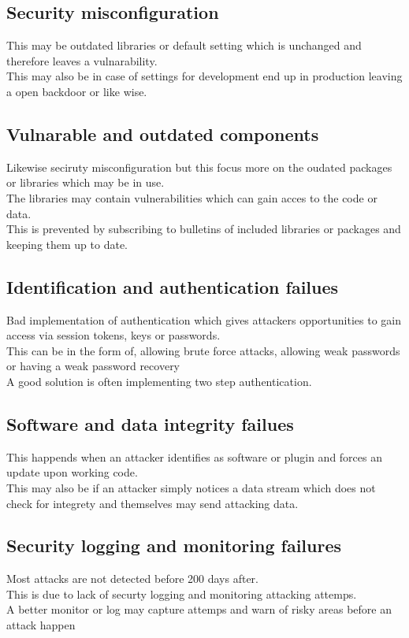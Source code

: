 \documentclass[12pt, a4paper]{article}
\begin{document}
		\subsection{Security misconfiguration}
			This may be outdated libraries or default setting which is unchanged and therefore leaves a vulnarability.\\
			This may also be in case of settings for development end up in production leaving a open backdoor or like wise.
		\subsection{Vulnarable and outdated components}
			Likewise seciruty misconfiguration but this focus more on the oudated packages or libraries which may be in use.\\
			The libraries may contain vulnerabilities which can gain acces to the code or data.\\
			This is prevented by subscribing to bulletins of included libraries or packages and keeping them up to date.
		\subsection{Identification and authentication failues}
			Bad implementation of authentication which gives attackers opportunities to gain access via session tokens, keys or passwords.\\
			This can be in the form of, allowing brute force attacks, allowing weak passwords or having a weak password recovery\\
			A good solution is often implementing two step authentication.
		\subsection{ Software and data integrity failues}
			This happends when an attacker identifies as software or plugin and forces an update upon working code.\\
			This may also be if an attacker simply notices a data stream which does not check for integrety and themselves may send attacking data.
		\subsection{Security logging and monitoring failures}
			Most attacks are not detected before 200 days after.\\
			This is due to lack of securty logging and monitoring attacking attemps.\\
			A better monitor or log may capture attemps and warn of risky areas before an attack happen
\end{document}
